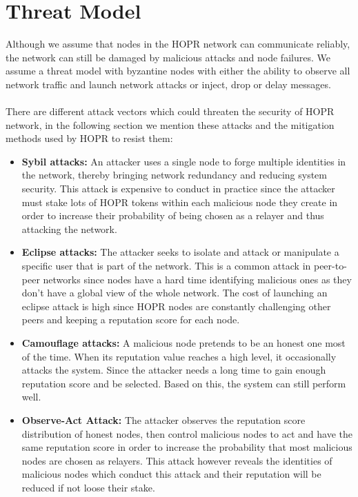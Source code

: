 \section{Threat Model}
Although we assume that nodes in the HOPR network can communicate reliably, the network can still be damaged by malicious attacks and node failures. We assume a threat model with byzantine nodes with either the ability to observe all network traffic and launch network attacks or inject, drop or delay messages. 
\\~\\There are different attack vectors which could threaten the security of HOPR network, in the following section we mention these attacks and the mitigation methods used by HOPR to resist them:
\begin{itemize}
    \item \textbf{Sybil attacks:} An attacker uses a single node to forge multiple identities in the network, thereby bringing network redundancy and reducing system security. This attack is expensive to conduct in practice since the attacker must stake lots of HOPR tokens within each malicious node they create in order to increase their probability of being chosen as a relayer and thus attacking the network. 
   \item \textbf{Eclipse attacks:} The attacker seeks to isolate and attack or manipulate a specific user that is part of the network. This is a common attack in peer-to-peer networks since nodes have a hard time identifying malicious ones as they don't have a global view of the whole network. The cost of launching an eclipse attack is high since HOPR nodes are constantly challenging other peers and keeping a reputation score for each node. 
   \item \textbf{Camouflage attacks:} A malicious node pretends to be an honest one most of the time. When its reputation value reaches a high level, it occasionally attacks the system. Since the attacker needs a long time to gain enough reputation score and be selected. Based on this, the system can still perform well.
   \item \textbf{Observe-Act Attack:} The attacker observes the reputation score distribution of honest nodes, then control malicious nodes to act and have the same reputation score in order to increase the probability that most malicious nodes are chosen as relayers.
   This attack however reveals the identities of malicious nodes which conduct this attack and their reputation will be reduced if not loose their stake.
\end{itemize}

